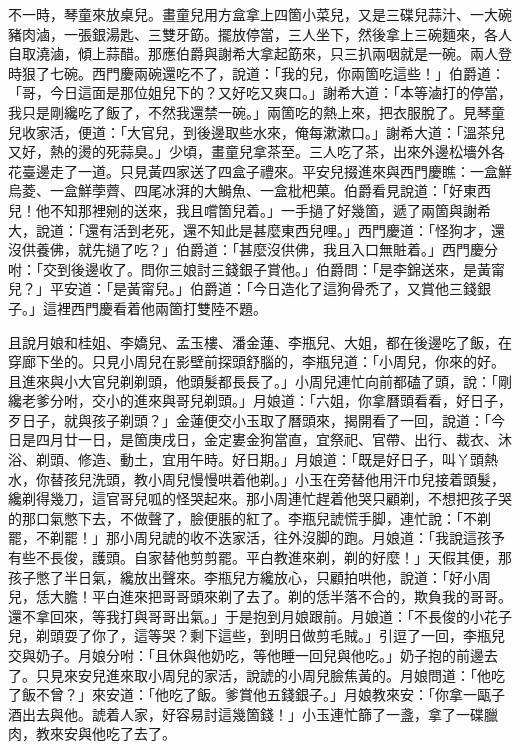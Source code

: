 不一時，琴童來放桌兒。畫童兒用方盒拿上四箇小菜兒，又是三碟兒蒜汁、一大碗豬肉滷，一張銀湯匙、三雙牙筯。擺放停當，三人坐下，然後拿上三碗麵來，各人自取澆滷，傾上蒜醋。那應伯爵與謝希大拿起筯來，只三扒兩咽就是一碗。兩人登時狠了七碗。西門慶兩碗還吃不了，說道：「我的兒，你兩箇吃這些！」伯爵道：「哥，今日這面是那位姐兒下的？又好吃又爽口。」謝希大道：「本等滷打的停當，我只是剛纔吃了飯了，不然我還禁一碗。」兩箇吃的熱上來，把衣服脫了。見琴童兒收家活，便道：「大官兒，到後邊取些水來，俺每漱漱口。」謝希大道：「溫茶兒又好，熱的燙的死蒜臭。」少頃，畫童兒拿茶至。三人吃了茶，出來外邊松墻外各花臺邊走了一道。只見黃四家送了四盒子禮來。平安兒掇進來與西門慶瞧：一盒鮮烏菱、一盒鮮荸薺、四尾冰湃的大鰣魚、一盒枇杷菓。伯爵看見說道：「好東西兒！他不知那裡剜的送來，我且嚐箇兒着。」一手撾了好幾箇，遞了兩箇與謝希大，說道：「還有活到老死，還不知此是甚麼東西兒哩。」西門慶道：「怪狗才，還沒供養佛，就先撾了吃？」伯爵道：「甚麼沒供佛，我且入口無賍着。」西門慶分咐：「交到後邊收了。問你三娘討三錢銀子賞他。」伯爵問：「是李錦送來，是黃甯兒？」平安道：「是黃甯兒。」伯爵道：「今日造化了這狗骨禿了，又賞他三錢銀子。」{}這裡西門慶看着他兩箇打雙陸不題。

且說月娘和桂姐、李嬌兒、孟玉樓、潘金蓮、李瓶兒、大姐，都在後邊吃了飯，在穿廊下坐的。只見小周兒在影壁前探頭舒腦的，李瓶兒道：「小周兒，你來的好。且進來與小大官兒剃剃頭，他頭髮都長長了。」小周兒連忙向前都磕了頭，說：「剛纔老爹分咐，交小的進來與哥兒剃頭。」月娘道：「六姐，你拿曆頭看看，好日子，歹日子，就與孩子剃頭？」金蓮便交小玉取了曆頭來，揭開看了一回，說道：「今日是四月廿一日，是箇庚戌日，金定婁金狗當直，宜祭祀、官帶、出行、裁衣、沐浴、剃頭、修造、動土，宜用午時。好日期。」月娘道：「既是好日子，叫丫頭熱水，你替孩兒洗頭，教小周兒慢慢哄着他剃。」{}小玉在旁替他用汗巾兒接着頭髮，纔剃得幾刀，這官哥兒呱的怪哭起來。那小周連忙趕着他哭只顧剃，不想把孩子哭的那口氣憋下去，不做聲了，臉便脹的紅了。李瓶兒諕慌手脚，連忙說：「不剃罷，不剃罷！」那小周兒諕的收不迭家活，往外沒脚的跑。月娘道：「我說這孩予有些不長俊，護頭。自家替他剪剪罷。平白教進來剃，剃的好麼！」天假其便，那孩子憋了半日氣，纔放出聲來。李瓶兒方纔放心，只顧拍哄他，說道：「好小周兒，恁大膽！平白進來把哥哥頭來剃了去了。剃的恁半落不合的，欺負我的哥哥。還不拿回來，等我打與哥哥出氣。」{}于是抱到月娘跟前。月娘道：「不長俊的小花子兒，剃頭耍了你了，這等哭？剩下這些，到明日做剪毛賊。」引逗了一回，李瓶兒交與奶子。月娘分咐：「且休與他奶吃，等他睡一回兒與他吃。」奶子抱的前邊去了。只見來安兒進來取小周兒的家活，說諕的小周兒臉焦黃的。月娘問道：「他吃了飯不曾？」來安道：「他吃了飯。爹賞他五錢銀子。」月娘教來安：「你拿一甌子酒出去與他。諕着人家，好容易討這幾箇錢！」小玉連忙篩了一盞，拿了一碟臘肉，教來安與他吃了去了。

